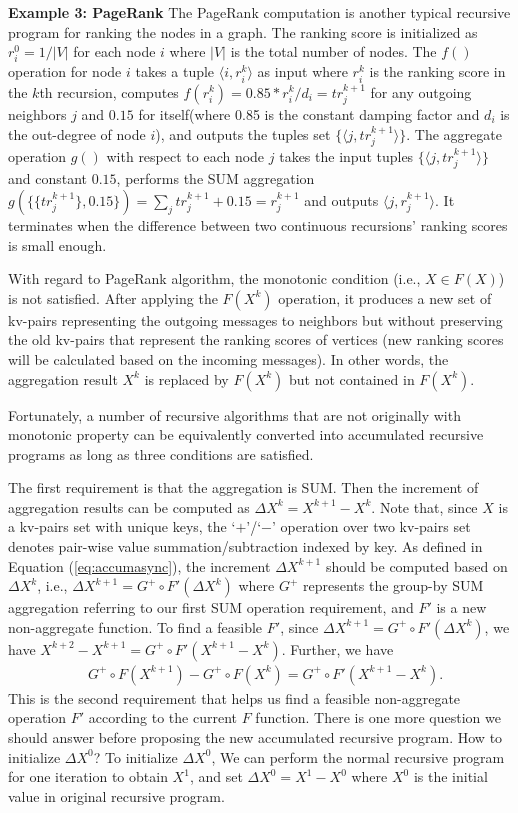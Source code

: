 \textbf{Example 3: PageRank} The PageRank computation is another typical recursive program for ranking the nodes in a graph. The ranking score is initialized as $r_i^0=1/|V|$ for each node $i$ where $|V|$ is the total number of nodes. The $f()$ operation for node $i$ takes a tuple $\langle i,r_i^k\rangle$ as input where $r_i^k$ is the ranking score in the $k$th recursion, computes $f(r_i^k)=0.85*r_i^k/d_i=tr_j^{k+1}$ for any outgoing neighbors $j$ and $0.15$ for itself(where 0.85 is the constant damping factor and $d_i$ is the out-degree of node $i$), and outputs the tuples set $\{\langle j,tr_j^{k+1}\rangle\}$. The aggregate operation $g()$ with respect to each node $j$ takes the input tuples $\{\langle j,tr_j^{k+1}\rangle\}$ and constant  $0.15$, performs the SUM aggregation $g(\{\{tr_j^{k+1}\},0.15\})=\sum_j{tr_j^{k+1}}+0.15=r_j^{k+1}$ and outputs $\langle j,r_j^{k+1}\rangle$. It terminates when the difference between two continuous recursions' ranking scores is small enough.

With regard to PageRank algorithm, the monotonic condition (i.e., $X\in F(X)$) is not satisfied. After applying the $F(X^k)$ operation, it produces a new set of kv-pairs representing the outgoing messages to neighbors but without preserving the old kv-pairs that represent the ranking scores of vertices (new ranking scores will be calculated based on the incoming messages). In other words, the aggregation result $X^{k}$ is replaced by $F(X^{k})$ but not contained in $F(X^{k})$.

Fortunately, a number of recursive algorithms that are not originally with monotonic property can be equivalently converted into accumulated recursive programs as long as three conditions are satisfied.

The first requirement is that the aggregation is SUM. Then the increment of aggregation results can be computed as $\Delta X^k=X^{k+1}-X^k$. Note that, since $X$ is a kv-pairs set with unique keys, the `$+$'/`$-$' operation over two kv-pairs set denotes pair-wise value summation/subtraction indexed by key. As defined in Equation (\ref{eq:accumasync}), the increment $\Delta X^{k+1}$ should be computed based on $\Delta X^k$, i.e., $\Delta X^{k+1}=G^{+}\circ F'(\Delta X^k)$ where $G^{+}$ represents the group-by SUM aggregation referring to our first SUM operation requirement, and $F'$ is a new non-aggregate function. To find a feasible $F'$, since $\Delta X^{k+1}=G^{+}\circ F'(\Delta X^k)$, we have $X^{k+2}-X^{k+1}=G^{+}\circ F'(X^{k+1}-X^k)$. Further, we have
\begin{equation}
\label{eq:findf}
\begin{aligned}
&G^{+}\circ F(X^{k+1})-G^{+}\circ F(X^{k})=G^{+}\circ F'(X^{k+1}-X^k).
\end{aligned}
\end{equation}
This is the second requirement that helps us find a feasible non-aggregate operation $F'$ according to the current $F$ function. There is one more question we should answer before proposing the new accumulated recursive program. How to initialize $\Delta X^0$? To initialize $\Delta X^0$,  We can perform the normal recursive program for one iteration to obtain $X^1$, and set $\Delta X^0=X^1-X^0$ where $X^0$ is the initial value in original recursive program. 

